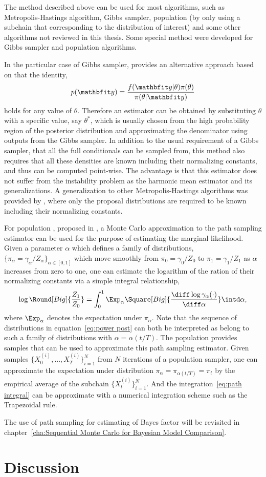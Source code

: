 The method described above can be used for most \mcmc algorithms, such as
Metropolis-Hastings algorithm, Gibbs sampler, population \mcmc (by only using
a subchain that corresponding to the distribution of interest) and some other
\mcmc algorithms not reviewed in this thesis. Some special method were
developed for Gibbs sampler and population \mcmc algorithms.

In the particular case of Gibbs sampler, \cite{Chib:1995em} provides an
alternative approach based on that the identity,
\begin{equation}
  p(\data) = \frac{f(\data|\theta)\pi(\theta)}{\pi(\theta|\data)}
\end{equation}
holds for any value of $\theta$. Therefore an estimator can be obtained by
substituting $\theta$ with a specific value, say $\theta^*$, which is usually
chosen from the high probability region of the posterior distribution and
approximating the denominator using outputs from the Gibbs sampler. In
addition to the usual requirement of a Gibbs sampler, that all the full
conditionals can be sampled from, this method also requires that all these
densities are known including their normalizing constants, and thus can be
computed point-wise. The advantage is that this estimator does not suffer from
the instability problem as the harmonic mean estimator and its
generalizations. A generalization to other Metropolis-Hastings algorithms was
provided by \cite{Chib:2001gq}, where only the proposal distributions are
required to be known including their normalizing constants.

For population \mcmc, proposed in \cite{Calderhead:2009bd}, a Monte Carlo
approximation to the path sampling estimator \cite{Gelman:1998ei} can be used
for the purpose of estimating the marginal likelihood. Given a parameter
$\alpha$ which defines a family of distributions, $\{\pi_{\alpha} =
\gamma_{\alpha}/Z_{\alpha}\}_{\alpha\in[0,1]}$ which move smoothly from $\pi_0
= \gamma_0/Z_0$ to $\pi_1 = \gamma_1/Z_1$ as $\alpha$ increases from zero to
one, one can estimate the logarithm of the ration of their normalizing
constants via a simple integral relationship,
\begin{equation}
  \log\Round[Big]{\frac{Z_1}{Z_0}} = \int_0^1\Exp_{\alpha}\Square[Big]{
    \frac{\diff\log\gamma_{\alpha}(\cdot)}{\diff\alpha}}\intd\alpha,
  \label{eq:path integral}
\end{equation}
where $\Exp_{\alpha}$ denotes the expectation under $\pi_{\alpha}$. Note that
the sequence of distributions in equation~\eqref{eq:power post} can both be
interpreted as belong to such a family of distributions with $\alpha =
\alpha(t/T)$. The population \mcmc provides samples that can be used to
approximate this path sampling estimator. Given samples
$\{X_0^{(i)},\dots,X_T^{(i)}\}_{i=1}^N$ from $N$ iterations of a population
\mcmc sampler, one can approximate the expectation under distribution
$\pi_{\alpha} = \pi_{\alpha(t/T)} = \pi_t$ by the empirical average of the
subchain $\{X_t^{(i)}\}_{i=1}^N$. And the integration~\eqref{eq:path integral}
can be approximate with a numerical integration scheme such as the Trapezoidal
rule.

The use of path sampling for estimating of Bayes factor will be revisited in
chapter~\ref{cha:Sequential Monte Carlo for Bayesian Model Comparison}.

\section{Discussion}
\label{sec:Monte Carlo Discussion}


